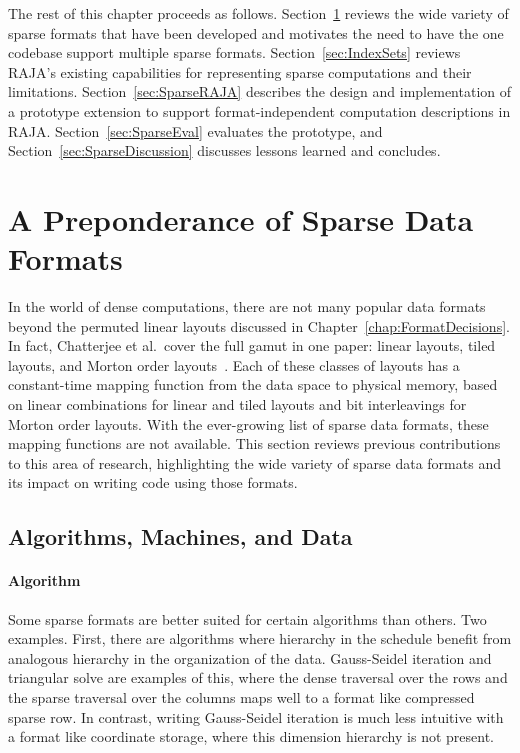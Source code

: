 The rest of this chapter proceeds as follows.
Section~\ref{sec:SparseFormats} reviews the wide variety of sparse formats that have been developed and motivates the need to have the one codebase support multiple sparse formats.
Section~\ref{sec:IndexSets} reviews RAJA's existing capabilities for representing sparse computations and their limitations.
Section~\ref{sec:SparseRAJA} describes the design and implementation of a prototype extension to support format-independent computation descriptions in RAJA\@.
Section~\ref{sec:SparseEval} evaluates the prototype, and Section~\ref{sec:SparseDiscussion} discusses lessons learned and concludes.



\section{A Preponderance of Sparse Data Formats}\label{sec:SparseFormats}



In the world of dense computations, there are not many popular data formats beyond the permuted linear layouts discussed in Chapter~\ref{chap:FormatDecisions}. 
In fact, Chatterjee et al.\ cover the full gamut in one paper: linear layouts, tiled layouts, and Morton order layouts~\cite{chatterjee1999recursive}.
Each of these classes of layouts has a constant-time mapping function from the data space to physical memory, based on linear combinations for linear and tiled layouts and bit interleavings for Morton order layouts.
With the ever-growing list of sparse data formats, these mapping functions are not available.
This section reviews previous contributions to this area of research, highlighting the wide variety of sparse data formats and its impact on writing code using those formats.


\subsection{Algorithms, Machines, and Data}

\paragraph{Algorithm}

Some sparse formats are better suited for certain algorithms than others.
Two examples.
First, there are algorithms where hierarchy in the schedule benefit from analogous hierarchy in the organization of the data.
Gauss-Seidel iteration and triangular solve are examples of this, where the dense traversal over the rows and the sparse traversal over the columns maps well to a format like compressed sparse row. 
In contrast, writing Gauss-Seidel iteration is much less intuitive with a format like coordinate storage, where this dimension hierarchy is not present.

